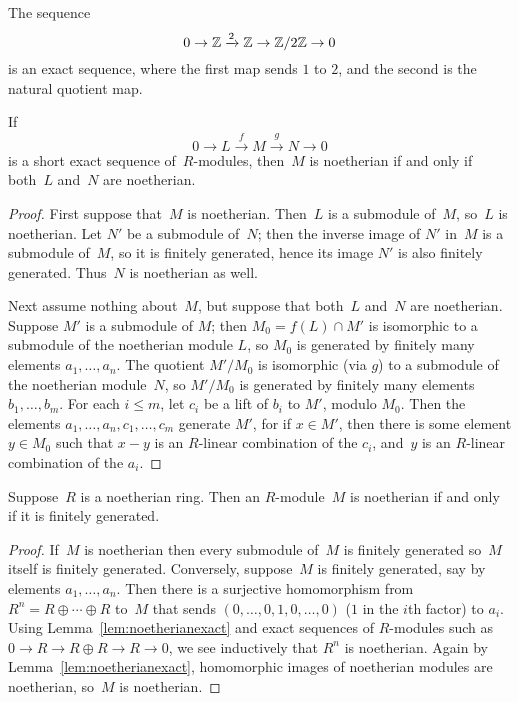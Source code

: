 \begin{example}
  The sequence
  $$
    0 \to \mathbb{Z} \xrightarrow{2} \mathbb{Z}\rightarrow \mathbb{Z}/2\mathbb{Z} \to 0
  $$
  is an exact sequence, where the first map sends $1$ to $2$,
  and the second is the natural quotient map.
\end{example}


\begin{lemma}\label{lem:noetherianexact}
  If
  $$
    0 \to L \xrightarrow{f} M \xrightarrow{g} N \to 0
  $$
  is a short exact sequence of~$R$-modules, then~$M$ is noetherian
  if and only if both~$L$ and~$N$ are noetherian.
\end{lemma}
\begin{proof}
  First suppose that~$M$ is noetherian.  Then~$L$ is a submodule
  of~$M$, so~$L$ is noetherian.  Let $N'$ be a submodule of~$N$;
  then the inverse image of $N'$ in~$M$ is a submodule of~$M$,
  so it is finitely generated, hence its image $N'$ is also finitely
  generated.  Thus~$N$ is noetherian as well.

  Next assume nothing about~$M$, but suppose that both~$L$ and~$N$ are
  noetherian.  Suppose $M'$ is a submodule of $M$; then $M_0=f(L)\cap M'$
  is isomorphic to a submodule of the noetherian module $L$, so $M_0$ is
  generated by finitely many elements $a_1,\dots, a_n$.  The quotient
  $M'/M_0$ is isomorphic (via $g$) to a submodule of the noetherian
  module~$N$, so $M'/M_0$ is generated by finitely many elements
  $b_1,\dots, b_m$. For each $i\leq m$, let $c_i$ be a lift of $b_i$ to
  $M'$, modulo $M_0$.  Then the elements $a_1,\dots, a_n, c_1,\dots,c_m$
  generate $M'$, for if $x\in M'$, then there is some element
  $y\in M_0$ such that $x-y$ is an $R$-linear combination of the $c_i$,
  and~$y$ is an $R$-linear combination of the $a_i$.
\end{proof}


\begin{proposition}
  \label{prop:noethfg}
  Suppose~$R$ is a noetherian ring.  Then an $R$-module~$M$ is
  noetherian if and only if it is finitely generated.
\end{proposition}
\begin{proof}
  If~$M$ is noetherian then every submodule of~$M$ is finitely generated
  so~$M$ itself is finitely generated.  Conversely, suppose~$M$ is
  finitely generated, say by elements $a_1,\dots, a_n$.  Then there is a
  surjective homomorphism from $R^n=R\oplus \cdots \oplus R$ to~$M$ that
  sends $(0,\dots,0,1,0,\dots,0)$ ($1$ in the $i$th factor) to $a_i$.
  Using Lemma~\ref{lem:noetherianexact} and exact sequences of
  $R$-modules such as $0\to R\to R\oplus R\to R\to 0$, we see
  inductively that $R^n$ is noetherian.  Again by
  Lemma~\ref{lem:noetherianexact}, homomorphic images of noetherian
  modules are noetherian, so~$M$ is noetherian.
\end{proof}

